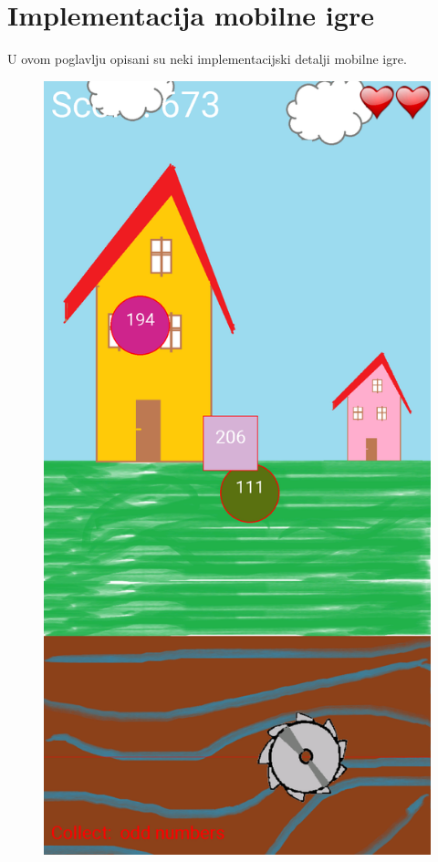 \documentclass[times, utf8, zavrsni, numeric]{fer}
\begin{document}
\chapter{Implementacija mobilne igre}
	U ovom poglavlju opisani su neki implementacijski detalji mobilne igre.\begin{figure}[!htb]
			\begin{minipage}{0.45\textwidth}
				\centering
				\includegraphics[scale=0.15]{"slike/slikaigre1.png"} 

\end{minipage}
\end{figure}
\end{document}
